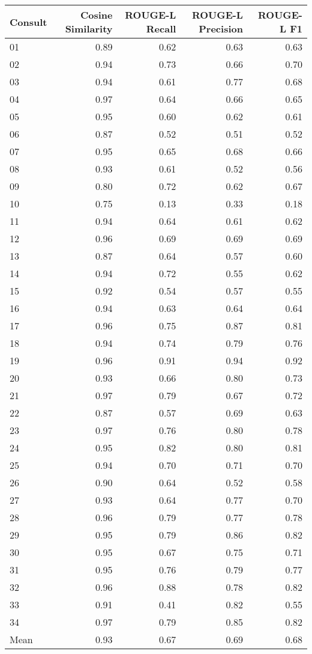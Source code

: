 \begin{tabular}{lrrrr}
\toprule
Consult & Cosine Similarity & ROUGE-L Recall & ROUGE-L Precision & ROUGE-L F1 \\
\midrule
01 & 0.89 & 0.62 & 0.63 & 0.63 \\
02 & 0.94 & 0.73 & 0.66 & 0.70 \\
03 & 0.94 & 0.61 & 0.77 & 0.68 \\
04 & 0.97 & 0.64 & 0.66 & 0.65 \\
05 & 0.95 & 0.60 & 0.62 & 0.61 \\
06 & 0.87 & 0.52 & 0.51 & 0.52 \\
07 & 0.95 & 0.65 & 0.68 & 0.66 \\
08 & 0.93 & 0.61 & 0.52 & 0.56 \\
09 & 0.80 & 0.72 & 0.62 & 0.67 \\
10 & 0.75 & 0.13 & 0.33 & 0.18 \\
11 & 0.94 & 0.64 & 0.61 & 0.62 \\
12 & 0.96 & 0.69 & 0.69 & 0.69 \\
13 & 0.87 & 0.64 & 0.57 & 0.60 \\
14 & 0.94 & 0.72 & 0.55 & 0.62 \\
15 & 0.92 & 0.54 & 0.57 & 0.55 \\
16 & 0.94 & 0.63 & 0.64 & 0.64 \\
17 & 0.96 & 0.75 & 0.87 & 0.81 \\
18 & 0.94 & 0.74 & 0.79 & 0.76 \\
19 & 0.96 & 0.91 & 0.94 & 0.92 \\
20 & 0.93 & 0.66 & 0.80 & 0.73 \\
21 & 0.97 & 0.79 & 0.67 & 0.72 \\
22 & 0.87 & 0.57 & 0.69 & 0.63 \\
23 & 0.97 & 0.76 & 0.80 & 0.78 \\
24 & 0.95 & 0.82 & 0.80 & 0.81 \\
25 & 0.94 & 0.70 & 0.71 & 0.70 \\
26 & 0.90 & 0.64 & 0.52 & 0.58 \\
27 & 0.93 & 0.64 & 0.77 & 0.70 \\
28 & 0.96 & 0.79 & 0.77 & 0.78 \\
29 & 0.95 & 0.79 & 0.86 & 0.82 \\
30 & 0.95 & 0.67 & 0.75 & 0.71 \\
31 & 0.95 & 0.76 & 0.79 & 0.77 \\
32 & 0.96 & 0.88 & 0.78 & 0.82 \\
33 & 0.91 & 0.41 & 0.82 & 0.55 \\
34 & 0.97 & 0.79 & 0.85 & 0.82 \\
Mean & 0.93 & 0.67 & 0.69 & 0.68 \\
\bottomrule
\end{tabular}
